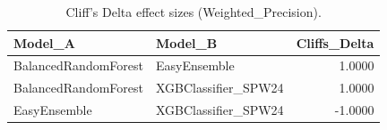 \begin{table}[t]
\centering
\begin{tabular}{llr}
\toprule
Model_A & Model_B & Cliffs_Delta \\
\midrule
BalancedRandomForest & EasyEnsemble & 1.0000 \\
BalancedRandomForest & XGBClassifier_SPW24 & 1.0000 \\
EasyEnsemble & XGBClassifier_SPW24 & -1.0000 \\
\bottomrule
\end{tabular}
\caption{Cliff's Delta effect sizes (Weighted_Precision).}
\label{tab:cliffs_Weighted_Precision}
\end{table}